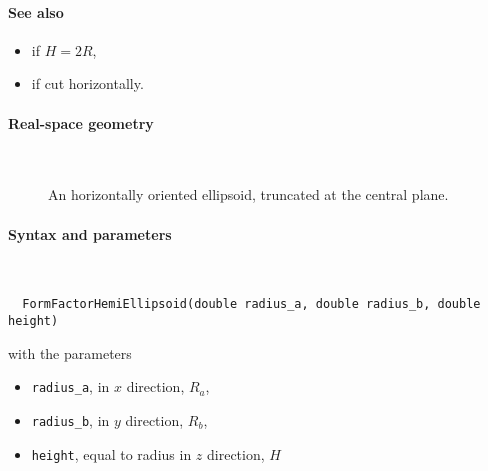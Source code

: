 \paragraph{See also}
\begin{itemize}
\item {} if $H=2R$,
\item {} if cut horizontally.
\end{itemize}

 \label{SHemiEllipsoid}

\paragraph{Real-space geometry}\strut\\

\begin{figure}[H]
\hfill
{}
\hfill
{}
\hfill
{}
\hfill
\caption{An horizontally oriented ellipsoid, truncated at the central plane.}
\end{figure}

\paragraph{Syntax and parameters}\strut\\[-2ex plus .2ex minus .2ex]
\begin{lstlisting}
  FormFactorHemiEllipsoid(double radius_a, double radius_b, double height)
\end{lstlisting}
with the parameters
\begin{itemize}
\item \texttt{radius\_a}, in $x$ direction, $R_a$,
\item \texttt{radius\_b}, in $y$ direction, $R_b$,
\item \texttt{height}, equal to radius in $z$ direction, $H$
\end{itemize}

